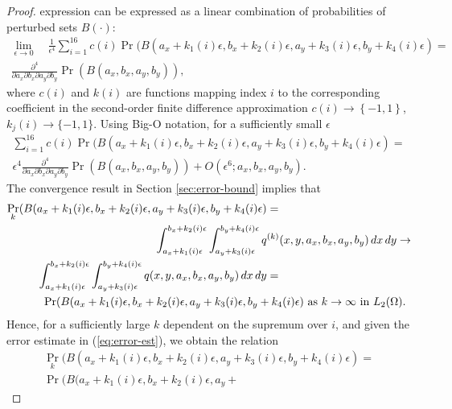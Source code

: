 \begin{proof}
  expression can be expressed as a linear combination of probabilities
  of perturbed sets $B(\cdot)$:
  \begin{multline*}
    \lim_{\epsilon \to 0}\quad \frac{1}{\epsilon^4} \sum_{i=1}^{16} c(i) \Pr(B(a_x + k_1(i)\epsilon, b_x + k_2(i)\epsilon, a_y + k_3(i)\epsilon, b_y + k_4(i)\epsilon) = \\
    \frac{\partial^4}{\partial a_x \partial b_x \partial a_y \partial b_y} \Pr(B(a_x, b_x, a_y, b_y)),
  \end{multline*}
where $c(i)$ and $k(i)$ are functions mapping index $i$ to the
corresponding coefficient in the second-order finite difference
approximation
  $c(i) \to \left\{-1, 1\right\}$, $k_j(i) \to \{-1,1\}$. Using Big-O
  notation, for a sufficiently small $\epsilon$
  \begin{multline}
    \sum_{i=1}^{16} c(i) \Pr(B(a_x + k_1(i)\epsilon, b_x +
    k_2(i)\epsilon, a_y + k_3(i)\epsilon, b_y + k_4(i)\epsilon) = \\
    \epsilon^4 \frac{\partial^4}{\partial a_x \partial b_x \partial
      a_y \partial b_y} \Pr(B(a_x, b_x, a_y, b_y)) + O(\epsilon^6 ;
    a_x, b_x, a_y, b_y). \label{eq:fin-diff}
  \end{multline}
  The convergence result in Section \ref{sec:error-bound} implies that
  \begin{align*}
    \Pr_k(B(a_x + k_1(i)\epsilon, b_x + k_2(i)\epsilon, a_y +
    k_3(i)\epsilon, b_y + k_4(i)\epsilon) &= \\
    \MoveEqLeft[10] \displaystyle \int_{a_x +
    k_1(i)\epsilon}^{b_x + k_2(i)\epsilon} \displaystyle \int_{a_y + k_3(i)\epsilon}^{b_y +
    k_4(i)\epsilon} q^{(k)}(x,y,a_x,b_x,a_y,b_y)\, dx\, dy \to \\
   \displaystyle
     \int_{a_x + k_1(i)\epsilon}^{b_x + k_2(i)\epsilon} \displaystyle \int_{a_y +
     k_3(i)\epsilon}^{b_y + k_4(i)\epsilon} q(x,y,a_x,b_x,a_y,b_y)\, dx\, dy &= \\
    \MoveEqLeft[20] \Pr(B(a_x + k_1(i)\epsilon, b_x + k_2(i)\epsilon, a_y +
    k_3(i)\epsilon, b_y + k_4(i)\epsilon) \mbox{ as } k \to \infty \mbox{ in } L_2(\Omega).
  \end{align*}
  Hence, for a sufficiently large $k$ dependent on the supremum over
  $i$, and given the error estimate in (\ref{eq:error-est}), we obtain
  the relation
  \begin{multline*}
    \Pr_k(B(a_x + k_1(i)\epsilon, b_x + k_2(i)\epsilon, a_y +
    k_3(i)\epsilon, b_y + k_4(i)\epsilon) = \\
    \Pr(B(a_x + k_1(i)\epsilon, b_x + k_2(i)\epsilon, a_y +

\end{multline*}
\end{proof}
